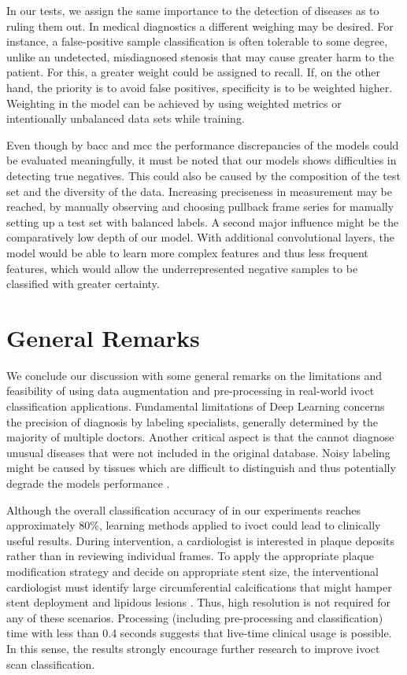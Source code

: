 In our tests, we assign the same importance to the detection of diseases as to ruling them out. In medical diagnostics a different weighing may be desired. For instance, a false-positive sample classification is often tolerable to some degree, unlike an undetected, misdiagnosed stenosis that may cause greater harm to the patient. For this, a greater weight could be assigned to recall. If, on the other hand, the priority is to avoid false positives, specificity is to be weighted higher. Weighting in the model can be achieved by using weighted metrics or intentionally unbalanced data sets while training.

Even though by \acrshort{bacc} and \acrshort{mcc} the performance discrepancies of the models could be evaluated meaningfully, it must be noted that our models shows difficulties in detecting true negatives. This could also be caused by the composition of the test set and the diversity of the data. Increasing preciseness in measurement may be reached, by manually observing and choosing pullback frame series for manually setting up a test set with balanced labels. A second major influence might be the comparatively low depth of our model. With additional convolutional layers, the model would be able to learn more complex features and thus less frequent features, which would allow the underrepresented negative samples to be classified with greater certainty.

\section{General Remarks}

We conclude our discussion with some general remarks on the limitations and feasibility of using data augmentation and pre-processing in real-world \acrshort{ivoct} classification applications. Fundamental limitations of Deep Learning concerns the precision of diagnosis by labeling specialists, generally determined by the majority of multiple doctors. Another critical aspect is that the  cannot diagnose unusual diseases that were not included in the original database. \cite{Kuwayama.2019} Noisy labeling might be caused by tissues which are difficult to distinguish and thus potentially degrade the models performance \cite{Kolluru.2018}.

Although the overall classification accuracy of  in our experiments reaches approximately 80\%, learning methods applied to \acrshort{ivoct} could lead to clinically useful results. During intervention, a cardiologist is interested in plaque deposits rather than in reviewing individual frames. To apply the appropriate plaque modification strategy and decide on appropriate stent size, the interventional cardiologist must identify large circumferential calcifications that might hamper stent deployment and lipidous lesions \cite{Kolluru.2018}. Thus, high resolution is not required for any of these scenarios. Processing (including pre-processing and classification) time with less than 0.4 seconds suggests that live-time clinical usage is possible. \cite{Kolluru.2018} In this sense, the results strongly encourage further research to improve \acrshort{ivoct} scan classification.
